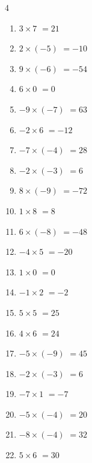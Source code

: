\begin{multicols}{4}
\begin{enumerate}
  \item $3\times 7$
        $=21$

  \item $2\times (-5)$
        $=-10$

  \item $9\times (-6)$
        $=-54$

  \item $6\times 0$
        $=0$

  \item $-9\times (-7)$
        $=63$

  \item $-2\times 6$
        $=-12$

  \item $-7\times (-4)$
        $=28$

  \item $-2\times (-3)$
        $=6$

  \item $8\times (-9)$
        $=-72$

  \item $1\times 8$
        $=8$

\columnbreak %

  \item $6\times (-8)$
        $=-48$

  \item $-4\times 5$
        $=-20$

  \item $1\times 0$
        $=0$

  \item $-1\times 2$
        $=-2$

  \item $5\times 5$
        $=25$

  \item $4\times 6$
        $=24$

  \item $-5\times (-9)$
        $=45$

  \item $-2\times (-3)$
        $=6$

  \item $-7\times 1$
        $=-7$

  \item $-5\times (-4)$
        $=20$

  \item $-8\times (-4)$
        $=32$

  \item $5\times 6$
        $=30$


\end{enumerate}
\end{multicols}
